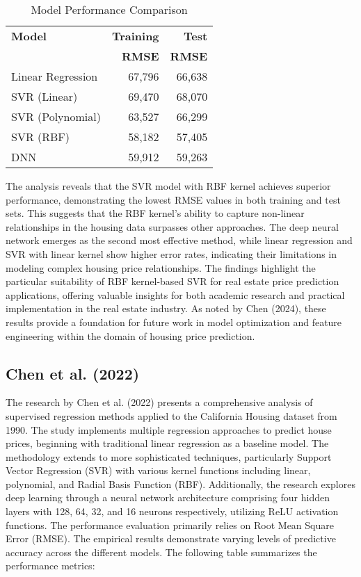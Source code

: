 \documentclass[a4paper, 11pt]{article}
\begin{document}
\begin{table}
\centering
\small
\begin{tabular}{@{}p{3.5cm}rr@{}}
\toprule
\textbf{Model} & \textbf{Training} & \textbf{Test} \\
& \textbf{RMSE} & \textbf{RMSE} \\
\midrule
Linear Regression & 67,796 & 66,638 \\
SVR (Linear) & 69,470 & 68,070 \\
SVR (Polynomial) & 63,527 & 66,299 \\
SVR (RBF) & 58,182 & 57,405 \\
DNN & 59,912 & 59,263 \\
\bottomrule
\end{tabular}
\caption{Model Performance Comparison}
\end{table}

The analysis reveals that the SVR model with RBF kernel achieves superior performance, demonstrating the lowest RMSE values in both training and test sets. This suggests that the RBF kernel's ability to capture non-linear relationships in the housing data surpasses other approaches. The deep neural network emerges as the second most effective method, while linear regression and SVR with linear kernel show higher error rates, indicating their limitations in modeling complex housing price relationships.
The findings highlight the particular suitability of RBF kernel-based SVR for real estate price prediction applications, offering valuable insights for both academic research and practical implementation in the real estate industry. As noted by Chen (2024), these results provide a foundation for future work in model optimization and feature engineering within the domain of housing price prediction.

\subsection{Chen et al. (2022)}
The research by Chen et al. (2022) presents a comprehensive analysis of supervised regression methods applied to the California Housing dataset from 1990. The study implements multiple regression approaches to predict house prices, beginning with traditional linear regression as a baseline model. The methodology extends to more sophisticated techniques, particularly Support Vector Regression (SVR) with various kernel functions including linear, polynomial, and Radial Basis Function (RBF). Additionally, the research explores deep learning through a neural network architecture comprising four hidden layers with 128, 64, 32, and 16 neurons respectively, utilizing ReLU activation functions.
The performance evaluation primarily relies on Root Mean Square Error (RMSE).
The empirical results demonstrate varying levels of predictive accuracy across the different models. The following table summarizes the performance metrics:
\end{document}
